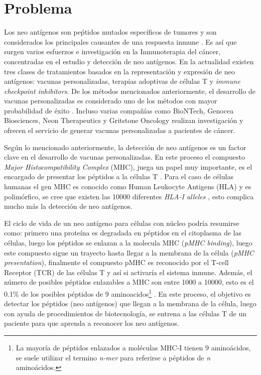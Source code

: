 \section{Problema}
\label{sec:problema}

Los neo antígenos son peṕtidos mutados específicos de tumores y son considerados los principales causantes de una respuesta inmune \citep{borden2022cancer, chen2021challenges, gopanenko2020main}. Es así que surgen varios esfuerzos e investigación en la Inmunoterapia del cáncer, concentradas en el estudio y detección de neo antígenos. En la actualidad existen tres clases de tratamientos basados en la representación y expresión de neo antígenos: vacunas personalizadas, terapias adoptivas de células T y \textit{immune checkpoint inhibitors}. De los métodos mencionados anteriormente, el desarrollo de vacunas personalizadas es considerado uno de los métodos con mayor probabilidad de éxito \citep{borden2022cancer}. Incluso varias compañías como BioNTech, Genocea Biosciences, Neon Therapeutics y Gritstone Oncology realizan investigación y ofrecen el servicio de generar vacunas personalizadas a pacientes de cáncer.

Según lo mencionado anteriormente, la detección de neo antígenos es un factor clave en el desarrollo de vacunas personalizadas. En este proceso el compuesto \textit{Major Histocompatibility Complex} (MHC), juega un papel muy importante, es el encargado de presentar los péptidos a la células T \citep{hashemi2022improved}. Para el caso de células humanas el gen MHC es conocido como Human Leukocyte Antigens (HLA) y es polimórfico, se cree que existen las 10000 diferentes \textit{HLA-I alleles} \citep{abelin2017mass}, esto complica mucho más la detección de neo antígenos. 

El ciclo de vida de un neo antígeno para células con núcleo podría resumirse como: primero una proteína es degradada en péptidos en el citoplasma de las células, luego los péptidos se enlazan a la molecula MHC (\textit{pMHC binding}), luego este compuesto sigue un trayecto hasta llegar a la membrana de la célula (\textit{pMHC presentation}), finalmente el compuesto pMHC es reconocido por  el T-cell Receptor (TCR) de las células T y así si activaría el sistema inmune. Además, el número de posibles péptidos enlazables a MHC  son entre 1000 a 10000, esto es el 0.1\% de los posibles péptidos  de 9 aminoacidos\footnote{La mayoría de péptidos enlazados a moléculas MHC-I tienen 9 aminoácidos, se suele utilizar el termino \textit{n-mer} para referirse a péptidos de \textit{n} aminoácidos.} \citep{abelin2017mass}. En este proceso, el objetivo es detectar los péptidos (neo antígenos) que llegan a la membrana de la célula, luego con ayuda de procedimientos de biotecnología, se entrena a las células T de un paciente para que aprenda a reconocer los neo antígenos.


